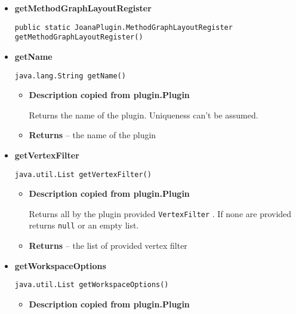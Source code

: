 {{{{{{{{{{{{{{{\begin{itemize}
{\begin{itemize}
{Returns all by the plugin provided \texttt{\small EdgeFilter}{\small 
{}}. If none are provided returns \texttt{\small null} or an empty list.
}
\item{{\bf  Returns} -- 
the list of provided edge filter 
}%
\end{itemize}
}%
\item{ 
{\bf  getMethodGraphLayoutRegister}\\
\begin{lstlisting}[frame=none]
public static JoanaPlugin.MethodGraphLayoutRegister getMethodGraphLayoutRegister()\end{lstlisting} %
}%
\item{ 
{\bf  getName}\\
\begin{lstlisting}[frame=none]
java.lang.String getName()\end{lstlisting} %
\begin{itemize}
\item{
{\bf  Description copied from plugin.Plugin{\small {}} }

Returns the name of the plugin. Uniqueness can't be assumed.
}
\item{{\bf  Returns} -- 
the name of the plugin 
}%
\end{itemize}
}%
\item{ 
{\bf  getVertexFilter}\\
\begin{lstlisting}[frame=none]
java.util.List getVertexFilter()\end{lstlisting} %
\begin{itemize}
\item{
{\bf  Description copied from plugin.Plugin{\small {}} }

Returns all by the plugin provided \texttt{\small VertexFilter}{\small 
{}}. If none are provided returns \texttt{\small null} or an empty list.
}
\item{{\bf  Returns} -- 
the list of provided vertex filter 
}%
\end{itemize}
}%
\item{ 
{\bf  getWorkspaceOptions}\\
\begin{lstlisting}[frame=none]
java.util.List getWorkspaceOptions()\end{lstlisting} %
\begin{itemize}
\item{
{\bf  Description copied from plugin.Plugin{\small {}} }

}
\end{itemize}}
\end{itemize}}}}}}}}}}}}}}}}
